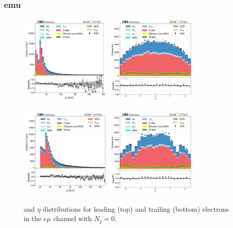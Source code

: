 \subsubsection{emu}

\begin{figure}[htb!]
    \centering
    \includegraphics[width=0.4\textwidth]{chapters/Appendix/sectionPlots/figures/data_mc_overlays/emu_2016_cat_eq0_eq0_a_signal_linear_lepton_lepton1_pt}
    \includegraphics[width=0.4\textwidth]{chapters/Appendix/sectionPlots/figures/data_mc_overlays/emu_2016_cat_eq0_eq0_a_signal_linear_lepton_lepton1_eta}

    \includegraphics[width=0.4\textwidth]{chapters/Appendix/sectionPlots/figures/data_mc_overlays/emu_2016_cat_eq0_eq0_a_signal_linear_lepton_lepton2_pt}
    \includegraphics[width=0.4\textwidth]{chapters/Appendix/sectionPlots/figures/data_mc_overlays/emu_2016_cat_eq0_eq0_a_signal_linear_lepton_lepton2_eta}
    \caption{\pt and $\eta$ distributions for leading (top) and trailing
    (bottom) electrons in the $e\mu$ channel with $N_{j} = 0$.}
    \label{fig:emu_1_kinematic}
\end{figure}

